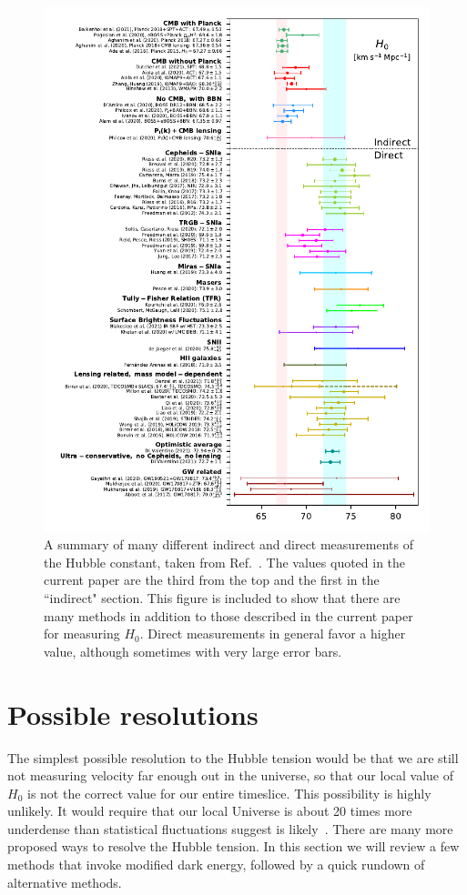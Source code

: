 \documentclass[12pt]{article}
\begin{document}
\begin{figure}
\centering
\includegraphics[width=.91\textwidth]{whisker}
\caption{A summary of many different indirect and direct measurements of the Hubble constant, taken from Ref.~\cite{DiValentino2021}. The values quoted in the current paper are the third from the top and the first in the ``indirect" section. This figure is included to show that there are many methods in addition to those described in the current paper for measuring $H_0$. Direct measurements in general favor a higher value, although sometimes with very large error bars.}
\label{fig:whisker}
\end{figure}

\section{Possible resolutions} \label{sec:resol}

The simplest possible resolution to the Hubble tension would be that we are still not measuring velocity far enough out in the universe, so that our local value of $H_0$ is not the correct value for our entire timeslice. This possibility is highly unlikely. It would require that our local Universe is about 20 times more underdense than statistical fluctuations suggest is likely~\cite{DiValentino2021}. There are many more proposed ways to resolve the Hubble tension. In this section we will review a few methods that invoke modified dark energy, followed by a quick rundown of alternative methods.
\end{document}
